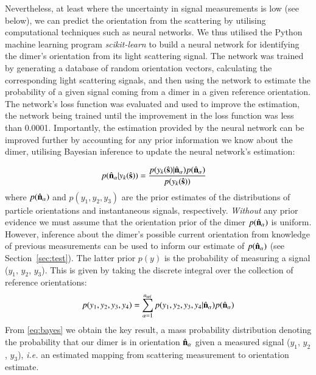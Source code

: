 \documentclass[preprint,  3p]{elsarticle}
\begin{document}
Nevertheless, at least where the uncertainty in signal measurements is low (see below), we can predict the orientation from the scattering by utilising computational techniques such as neural networks. We thus utilised the Python machine learning program \textit{scikit-learn} to build a neural network for identifying the dimer's orientation from its light scattering signal. The network was trained by generating a database of random orientation vectors, calculating the corresponding light scattering signals, and then using the network to estimate the probability of a given signal coming from a dimer in a given reference orientation. The network's loss function was evaluated and used to improve the estimation, the network being trained until the improvement in the loss function was less than 0.0001. 
%
Importantly, the estimation provided by the neural network can be improved further by accounting for any prior information we know about the dimer, utilising Bayesian inference to update the neural network's estimation: 

\begin{align}
  \label{eq:bayes}
  p(\hat{\bf n}_\alpha| y_k(\hat{\bf s}))
  &=
    \frac{p(y_k(\hat{\bf s})|\hat{\bf n}_\alpha)
    p(\hat{\bf n}_\alpha)}{p(y_k(\hat{\bf s}))}
\end{align}
where $p(\hat{\bf n}_\alpha)$ and $p(y_1, y_2, y_3)$ are the prior estimates of the distributions of particle orientations and instantaneous signals, respectively.
\textit{Without} any prior evidence we must assume that the orientation prior of the dimer
$p(\hat{\bf n}_{\alpha})$ is uniform. However, inference about the dimer's possible current orientation from knowledge of previous
measurements can be used to inform our estimate of $p(\hat{\bf n}_{\alpha})$ (see Section~\ref{sec:test}). The latter prior $p(y)$ is the probability of measuring a signal ($y_1$, $y_2$, $y_3$).  This is given by taking the discrete integral over the collection of reference orientations:
\begin{align}
  p(y_1, y_2, y_3, y_4)
  =
  \sum_{\alpha=1}^{n_{\rm ref}}
  p(y_1, y_2, y_3, y_4|\hat{\bf n}_\alpha)
  p(\hat{\bf n}_\alpha)
\end{align}
From \eqref{eq:bayes} we obtain the key result, a mass probability distribution denoting the
probability that our dimer is in orientation $\hat{\bf n}_{\alpha}$ given a measured
signal ($y_1$, $y_2$, $y_3$), \textit{i.e.} an estimated mapping from scattering measurement to orientation estimate. 

\end{document}
